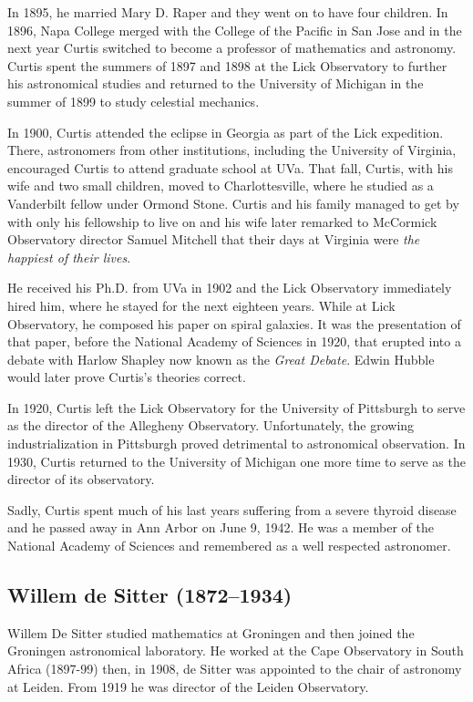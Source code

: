 In 1895, he married Mary D. Raper and they went on to have four children. In 1896, Napa College merged with the College of the Pacific in San Jose and in the next year Curtis switched to become a professor of mathematics and astronomy. Curtis spent the summers of 1897 and 1898 at the Lick Observatory to further his astronomical studies and returned to the University of Michigan in the summer of 1899 to study celestial mechanics.

In 1900, Curtis attended the eclipse in Georgia as part of the Lick expedition. There, astronomers from other institutions, including the University of Virginia, encouraged Curtis to attend graduate school at UVa. That fall, Curtis, with his wife and two small children, moved to Charlottesville, where he studied as a Vanderbilt fellow under Ormond Stone. Curtis and his family managed to get by with only his fellowship to live
on and his wife later remarked to McCormick Observatory director Samuel Mitchell that their days at Virginia were \textit{the happiest of their lives}.

He received his Ph.D. from UVa in 1902 and the Lick Observatory immediately hired him, where he stayed for the next eighteen years. While at Lick Observatory, he composed his paper on spiral galaxies. It was the presentation of that paper, before the National Academy of Sciences in 1920, that erupted into a debate with Harlow Shapley now known as the \textit{Great Debate}. Edwin Hubble would later prove Curtis's theories correct.

In 1920, Curtis left the Lick Observatory for the University of Pittsburgh to serve as the director of the Allegheny Observatory. Unfortunately, the growing industrialization in Pittsburgh proved detrimental to astronomical observation. In 1930, Curtis returned to the University of Michigan one more time to serve as the director of its observatory.

Sadly, Curtis spent much of his last years suffering from a severe thyroid disease and he passed away in Ann Arbor on June 9, 1942. He was a member of the National Academy of Sciences and remembered as a well respected astronomer.

\subsection[Willem \scshape{de Sitter}]{Willem de Sitter (1872--1934)}\label{bio:de-sitter}
Willem De Sitter studied mathematics at Groningen and then joined the Groningen astronomical laboratory. He worked at the Cape Observatory in South Africa (1897-99) then, in 1908, de Sitter was appointed to the chair of astronomy at Leiden. From 1919 he was director of the Leiden Observatory.

